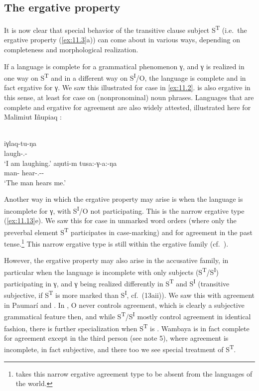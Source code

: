 \documentclass[output=paper]{langsci/langscibook}
\begin{document}
\subsection{The ergative property}\label{sec:11.5.1}

It is now clear that special behavior of the transitive clause subject
S\textsuperscript{T} (i.e.\ the ergative property (\ref{ex:11.3}a)) can come about in
various ways, depending on completeness and morphological realization.

If a language is complete for a grammatical phenomenon γ, and γ is realized in
one way on S\textsuperscript{T} and in a different way on
S\textsuperscript{I}/O, the language is complete and in fact ergative for γ. We
saw this illustrated for case in  \eqref{ex:11.2}.  is also ergative
in this sense, at least for case on (nonpronominal) noun phrases. Languages
that are complete and ergative for agreement are also widely attested,
illustrated here for Malimiut Iñupiaq \citep{Lanz2010}:

\ea%
    \label{ex:11.15} {\parencite[188]{Lanz2010}}\\
	\ea
		\gll iγlaq-tu-ŋa\\
			laugh-\Intr.\Ind-\Fsg{}\\
		\glt ‘I am laughing.’
	\ex
		\gll aŋuti-m  tusa:-γ-a:-ŋa\\
			man-\Erg{}  hear-\Tr.\Ind{}-\Tsg{}-\Fsg{}\\
		\glt ‘The man hears me.’
	\z
\z

Another way in which the ergative property may arise is when the language is
incomplete for γ, with S\textsuperscript{I}/O not participating. This is the
narrow ergative type (\ref{ex:11.13}e). We saw this for case in  unmarked word
orders (where only the preverbal element S\textsuperscript{T} participates in
case-marking) and for agreement in the  past
tense.\footnote{\citet[305]{Bobaljik2008} takes this narrow ergative agreement
type to be absent from the languages of the world.} This narrow ergative type
is still within the ergative family (cf.\ ).

However, the ergative property may also arise in the accusative family, in
particular when the language is incomplete with only subjects
(S\textsuperscript{T}/S\textsuperscript{I}) participating in γ, and γ being
realized differently in S\textsuperscript{T} and S\textsuperscript{I}
(transitive subjective, if S\textsuperscript{T} is more marked than
S\textsuperscript{I}, cf.\ (13aii)). We saw this with \Tsg{} agreement in
Paumarí and . In , O never controls agreement, which is clearly a
subjective grammatical feature then, and while
S\textsuperscript{T}/S\textsuperscript{I} mostly control agreement in identical
fashion, there is further specialization when S\textsuperscript{T} is \Tsg{}.
Wambaya is in fact complete for agreement except in the third person (see note
5), where agreement is incomplete, in fact subjective, and there too we see
special treatment of S\textsuperscript{T}.
\end{document}
